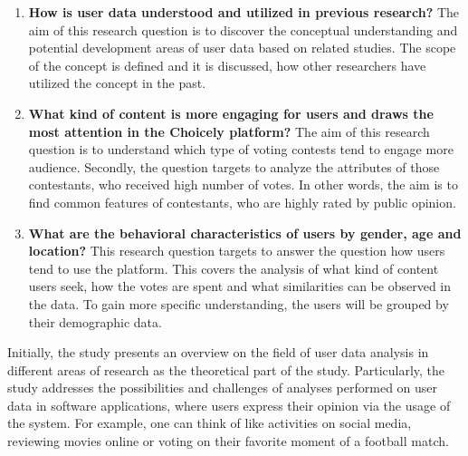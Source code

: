     \begin{enumerate}[label=RQ\arabic*:]
        \item \textbf{How is user data understood and utilized in previous research?} The aim of this research question is to discover the conceptual understanding and potential development areas of user data based on related studies. The scope of the concept is defined and it is discussed, how other researchers have utilized the concept in the past.
        
        \item \textbf{What kind of content is more engaging for users and draws the most attention in the Choicely platform?} The aim of this research question is to understand which type of voting contests tend to engage more audience. Secondly, the question targets to analyze the attributes of those contestants, who received high number of votes. In other words, the aim is to find common features of contestants, who are highly rated by public opinion.

        \item \textbf{What are the behavioral characteristics of users by gender, age and location?} This research question targets to answer the question how users tend to use the platform. This covers the analysis of what kind of content users seek, how the votes are spent and what similarities can be observed in the data. To gain more specific understanding, the users will be grouped by their demographic data.



    \end{enumerate}

    Initially, the study presents an overview on the field of user data analysis in different areas of research as the theoretical part of the study. Particularly, the study addresses the possibilities and challenges of analyses performed on user data in software applications, where users express their opinion via the usage of the system. For example, one can think of like activities on social media, reviewing movies online or voting on their favorite moment of a football match.

